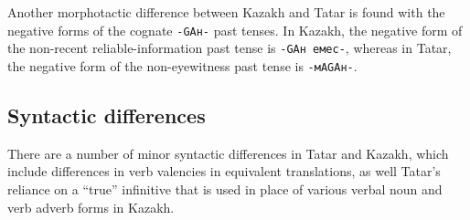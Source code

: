 \documentclass[a4paper,11pt]{article}
\begin{document}
Another morphotactic difference between Kazakh and Tatar is found with the negative forms of the 
cognate \texttt{-GAн-} past tenses.  In Kazakh, the negative form of the non-recent reliable-information past tense 
is \texttt{-GAн емес-}, whereas in Tatar, the negative form of the non-eyewitness past tense is \texttt{-мAGAн-}.


%

%

\subsection{Syntactic differences}

There are a number of minor syntactic differences in Tatar and Kazakh, which include differences in verb valencies in equivalent translations, as well Tatar's reliance on a ``true'' infinitive that is used in place of various verbal noun and verb adverb forms in Kazakh.
\end{document}
